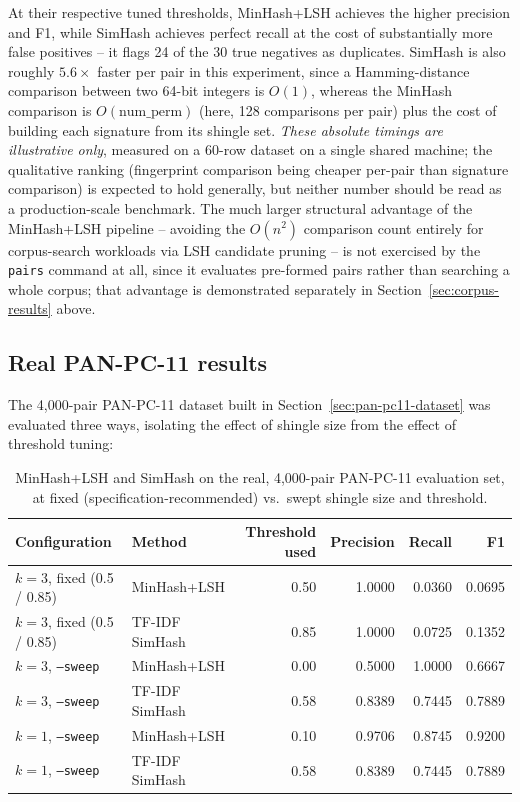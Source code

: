\documentclass[11pt]{article}
\begin{document}
At their respective tuned thresholds, MinHash+LSH achieves the higher precision and F1, while SimHash
achieves perfect recall at the cost of substantially more false positives -- it flags 24 of the 30 true
negatives as duplicates. SimHash is also roughly $5.6\times$ faster per pair in this experiment, since a
Hamming-distance comparison between two 64-bit integers is $O(1)$, whereas the MinHash comparison is
$O(\text{num\_perm})$ (here, 128 comparisons per pair) plus the cost of building each signature from its
shingle set. \emph{These absolute timings are illustrative only}, measured on a 60-row dataset on a single
shared machine; the qualitative ranking (fingerprint comparison being cheaper per-pair than signature
comparison) is expected to hold generally, but neither number should be read as a production-scale
benchmark. The much larger structural advantage of the MinHash+LSH pipeline -- avoiding the $O(n^2)$
comparison count entirely for corpus-search workloads via LSH candidate pruning -- is not exercised by the
\texttt{pairs} command at all, since it evaluates pre-formed pairs rather than searching a whole corpus;
that advantage is demonstrated separately in Section~\ref{sec:corpus-results} above.

\subsection{Real PAN-PC-11 results}
\label{sec:pan-pc11-results}

The 4{,}000-pair PAN-PC-11 dataset built in Section~\ref{sec:pan-pc11-dataset} was evaluated three ways,
isolating the effect of shingle size from the effect of threshold tuning:

\begin{table}[H]
    \centering
    \caption{MinHash+LSH and SimHash on the real, 4{,}000-pair PAN-PC-11 evaluation set, at fixed
    (specification-recommended) vs.\ swept shingle size and threshold.}
    \label{tab:pan-pc11-results}
    \begin{tabular}{@{}llrrrr@{}}
        \toprule
        Configuration & Method & Threshold used & Precision & Recall & F1 \\
        \midrule
        $k=3$, fixed (0.5 / 0.85) & MinHash+LSH   & 0.50 & 1.0000 & 0.0360 & 0.0695 \\
        $k=3$, fixed (0.5 / 0.85) & TF-IDF SimHash & 0.85 & 1.0000 & 0.0725 & 0.1352 \\
        $k=3$, \texttt{--sweep}   & MinHash+LSH   & 0.00 & 0.5000 & 1.0000 & 0.6667 \\
        $k=3$, \texttt{--sweep}   & TF-IDF SimHash & 0.58 & 0.8389 & 0.7445 & 0.7889 \\
        $k=1$, \texttt{--sweep}   & MinHash+LSH   & 0.10 & 0.9706 & 0.8745 & 0.9200 \\
        $k=1$, \texttt{--sweep}   & TF-IDF SimHash & 0.58 & 0.8389 & 0.7445 & 0.7889 \\
        \bottomrule
    \end{tabular}
\end{table}
\end{document}
